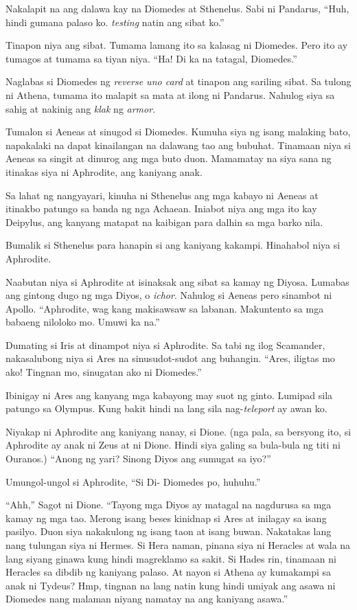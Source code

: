 \documentclass[12pt,letterpaper]{report}
\begin{document}
Nakalapit na ang dalawa kay na Diomedes at Sthenelus. Sabi ni Pandarus, ``Huh, hindi gumana palaso ko. \textit{testing} natin ang sibat ko.''

Tinapon niya ang sibat. Tumama lamang ito sa kalasag ni Diomedes. Pero ito ay tumagos at tumama sa tiyan niya. ``Ha! Di ka na tatagal, Diomedes.''

Naglabas si Diomedes ng \textit{reverse uno card} at tinapon ang sariling sibat. Sa tulong ni Athena, tumama ito malapit sa mata at ilong ni Pandarus. Nahulog siya sa sahig at nakinig ang \textit{klak} ng \textit{armor}.

Tumalon si Aeneas at sinugod si Diomedes. Kumuha siya ng isang malaking bato, napakalaki na dapat kinailangan na dalawang tao ang bubuhat. Tinamaan niya si Aeneas sa singit at dinurog ang mga buto duon. Mamamatay na siya sana ng itinakas siya ni Aphrodite, ang kaniyang anak.

Sa lahat ng nangyayari, kinuha ni Sthenelus ang mga kabayo ni Aeneas at itinakbo patungo sa banda ng nga Achaean. Iniabot niya ang mga ito kay Deipylus, ang kanyang matapat na kaibigan para dalhin sa mga barko nila.

Bumalik si Sthenelus para hanapin si ang kaniyang kakampi. Hinahabol niya si Aphrodite.

Naabutan niya si Aphrodite at isinaksak ang sibat sa kamay ng Diyosa. Lumabas ang gintong dugo ng mga Diyos, o \textit{ichor}. Nahulog si Aeneas pero sinambot ni Apollo. ``Aphrodite, wag kang makisawsaw sa labanan. Makuntento sa mga babaeng niloloko mo. Umuwi ka na.''

Dumating si Iris at dinampot niya si Aphrodite. Sa tabi ng ilog Scamander, nakasalubong niya si Ares na sinusudot-sudot ang buhangin. ``Ares, iligtas mo ako! Tingnan mo, sinugatan ako ni Diomedes.''

Ibinigay ni Ares ang kanyang mga kabayong may suot ng ginto. Lumipad sila patungo sa Olympus. Kung bakit hindi na lang sila nag-\textit{teleport} ay awan ko.

Niyakap ni Aphrodite ang kaniyang nanay, si Dione. (nga pala, sa bersyong ito, si Aphrodite ay anak ni Zeus at ni Dione. Hindi siya galing sa bula-bula ng titi ni Ouranos.) ``Anong ng yari? Sinong Diyos ang sumugat sa iyo?''

Umungol-ungol si Aphrodite, ``Si Di- Diomedes po, huhuhu.''

``Ahh,'' Sagot ni Dione. ``Tayong mga Diyos ay matagal na nagdurusa sa mga kamay ng mga tao. Merong isang beses kinidnap si Ares at inilagay sa isang pasilyo. Duon siya nakakulong ng isang taon at isang buwan. Nakatakas lang nang tulungan siya ni Hermes. Si Hera naman, pinana siya ni Heracles at wala na lang siyang ginawa kung hindi magreklamo sa sakit. Si Hades rin, tinamaan ni Heracles sa dibdib ng kaniyang palaso. At nayon si Athena ay kumakampi sa anak ni Tydeus? Hmp, tingnan na lang natin kung hindi umiyak ang asawa ni Diomedes nang malaman niyang namatay na ang kaniyang asawa.''
\end{document}
